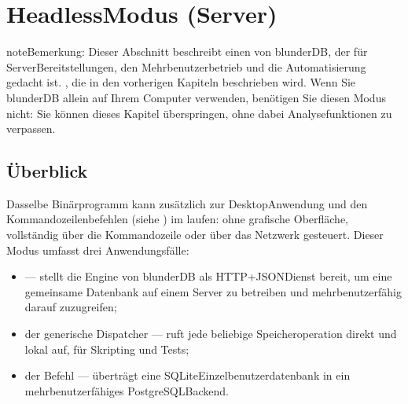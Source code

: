 \documentclass[letterpaper,10pt,german]{sphinxmanual}
\begin{document}
\sphinxstepscope


\section{Headless\sphinxhyphen{}Modus (Server)}
\label{\detokenize{mode_headless:mode-headless-serveur}}\label{\detokenize{mode_headless:headless}}\label{\detokenize{mode_headless::doc}}
\begin{sphinxadmonition}{note}{Bemerkung:}
\sphinxAtStartPar
Dieser Abschnitt beschreibt einen  von blunderDB, der für Server\sphinxhyphen{}Bereitstellungen, den Mehrbenutzerbetrieb und die Automatisierung gedacht ist. , die in den vorherigen Kapiteln beschrieben wird. Wenn Sie blunderDB allein auf Ihrem Computer verwenden, benötigen Sie diesen Modus nicht: Sie können dieses Kapitel überspringen, ohne dabei Analysefunktionen zu verpassen.
\end{sphinxadmonition}


\subsection{Überblick}
\label{\detokenize{mode_headless:vue-d-ensemble}}
\sphinxAtStartPar
Dasselbe Binärprogramm  kann zusätzlich zur Desktop\sphinxhyphen{}Anwendung und den Kommandozeilenbefehlen (siehe {\hyperref[\detokenize{cli:cli}]{}}) im  laufen: ohne grafische Oberfläche, vollständig über die Kommandozeile oder über das Netzwerk gesteuert. Dieser Modus umfasst drei Anwendungsfälle:
\begin{itemize}
\item {} 
\sphinxAtStartPar
{}  — stellt die Engine von blunderDB als HTTP\sphinxhyphen{}+\sphinxhyphen{}JSON\sphinxhyphen{}Dienst bereit, um eine gemeinsame Datenbank auf einem Server zu betreiben und mehrbenutzerfähig darauf zuzugreifen;

\item {} 
\sphinxAtStartPar
der generische Dispatcher  — ruft jede beliebige Speicheroperation direkt und lokal auf, für Skripting und Tests;

\item {} 
\sphinxAtStartPar
der Befehl  — überträgt eine SQLite\sphinxhyphen{}Einzelbenutzerdatenbank in ein mehrbenutzerfähiges PostgreSQL\sphinxhyphen{}Backend.

\end{itemize}
\end{document}
